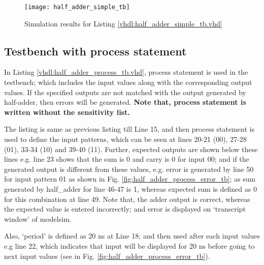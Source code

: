 

\begin{figure}[!h]
	\centering
	\texttt{[image: half\_adder\_simple\_tb]}
	\caption{Simulation results for Listing \ref{vhdl:half_adder_simple_tb.vhd}}
	\label{fig:half_adder_simple_tb}
\end{figure}


\subsection{Testbench with process statement} \label{sec:tb_with_process_statement}
In Listing \ref{vhdl:half_adder_process_tb.vhd}, process statement is used in the testbench; which includes the input values along with the corresponding output values.  If the specified outputs are not matched with the output generated by half-adder, then errors will be generated. \textbf{Note that, process statement is written without the sensitivity list.}

\begin{explanation}
	The listing is same as previous listing till Line 15, and then process statement is used to define the input patterns, which can be seen at lines 20-21 (00),  27-28 (01), 33-34 (10) and 39-40 (11). Further, expected outputs are shown below these lines e.g. line 23 shows that the sum is 0 and carry is 0 for input 00; and if the generated output is different from these values, e.g. error is generated by line 50 for input pattern 01 as shown in Fig. \ref{fig:half_adder_process_error_tb}; as sum generated by half\_adder for line 46-47 is 1, whereas expected sum is defined as 0 for this combination at line 49. Note that, the adder output is correct, whereas the expected value is entered incorrectly; and error is displayed on `transcript window' of modelsim. 
	
	Also, `period' is defined as 20 ns at Line 18; and then used after each input values e.g line 22, which indicates that input will be displayed for 20 ns before going to next input values (see in Fig. \ref{fig:half_adder_process_error_tb}).
\end{explanation}



